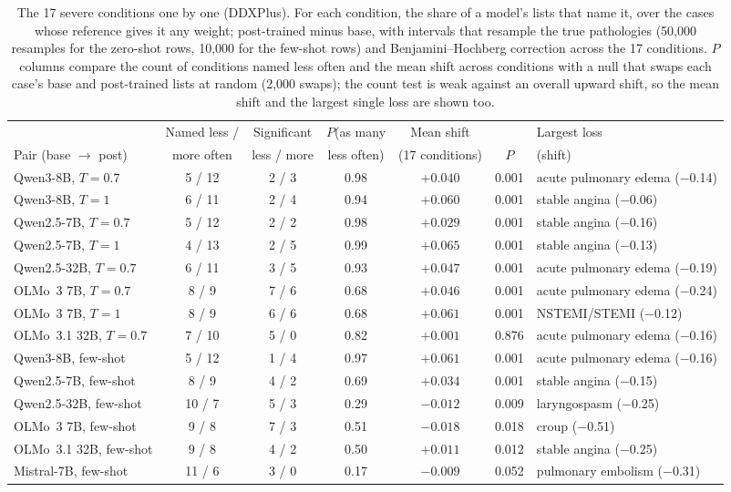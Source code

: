 \documentclass[wcp]{jmlr}
\begin{document}
\begin{table}[t]
\centering\small
\begin{adjustbox}{max width=\linewidth}
\begin{tabular}{lcccccl}
\toprule
 & Named less / & Significant & $P$(as many & Mean shift & & Largest loss \\
Pair (base $\rightarrow$ post) & more often & less / more & less often) & (17 conditions) & $P$ & (shift) \\
\midrule
Qwen3-8B, $T{=}0.7$ & 5 / 12 & 2 / 3 & 0.98 & $+0.040$ & 0.001 & acute pulmonary edema ($-$0.14) \\
Qwen3-8B, $T{=}1$ & 6 / 11 & 2 / 4 & 0.94 & $+0.060$ & 0.001 & stable angina ($-$0.06) \\
Qwen2.5-7B, $T{=}0.7$ & 5 / 12 & 2 / 2 & 0.98 & $+0.029$ & 0.001 & stable angina ($-$0.16) \\
Qwen2.5-7B, $T{=}1$ & 4 / 13 & 2 / 5 & 0.99 & $+0.065$ & 0.001 & stable angina ($-$0.13) \\
Qwen2.5-32B, $T{=}0.7$ & 6 / 11 & 3 / 5 & 0.93 & $+0.047$ & 0.001 & acute pulmonary edema ($-$0.19) \\
OLMo~3 7B, $T{=}0.7$ & 8 / 9 & 7 / 6 & 0.68 & $+0.046$ & 0.001 & acute pulmonary edema ($-$0.24) \\
OLMo~3 7B, $T{=}1$ & 8 / 9 & 6 / 6 & 0.68 & $+0.061$ & 0.001 & NSTEMI/STEMI ($-$0.12) \\
OLMo~3.1 32B, $T{=}0.7$ & 7 / 10 & 5 / 0 & 0.82 & $+0.001$ & 0.876 & acute pulmonary edema ($-$0.16) \\
\midrule
Qwen3-8B, few-shot & 5 / 12 & 1 / 4 & 0.97 & $+0.061$ & 0.001 & acute pulmonary edema ($-$0.16) \\
Qwen2.5-7B, few-shot & 8 / 9 & 4 / 2 & 0.69 & $+0.034$ & 0.001 & stable angina ($-$0.15) \\
Qwen2.5-32B, few-shot & 10 / 7 & 5 / 3 & 0.29 & $-0.012$ & 0.009 & laryngospasm ($-$0.25) \\
OLMo~3 7B, few-shot & 9 / 8 & 7 / 3 & 0.51 & $-0.018$ & 0.018 & croup ($-$0.51) \\
OLMo~3.1 32B, few-shot & 9 / 8 & 4 / 2 & 0.50 & $+0.011$ & 0.012 & stable angina ($-$0.25) \\
Mistral-7B, few-shot & 11 / 6 & 3 / 0 & 0.17 & $-0.009$ & 0.052 & pulmonary embolism ($-$0.31) \\
\bottomrule
\end{tabular}
\end{adjustbox}
\caption{The 17 severe conditions one by one (DDXPlus). For each condition, the share of a model's lists that name it, over the cases whose reference gives it any weight; post-trained minus base, with intervals that resample the true pathologies (50,000 resamples for the zero-shot rows, 10,000 for the few-shot rows) and Benjamini--Hochberg correction across the 17 conditions. $P$ columns compare the count of conditions named less often and the mean shift across conditions with a null that swaps each case's base and post-trained lists at random (2,000 swaps); the count test is weak against an overall upward shift, so the mean shift and the largest single loss are shown too.}
\label{tab:severetest}
\end{table}
\end{document}

